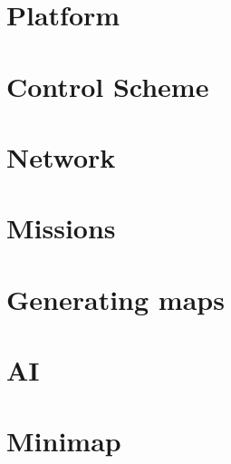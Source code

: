 \chapter{Platform}


\chapter{Control Scheme}



\chapter{Network}


\chapter{Missions}\label{chapter:modules:missions}


\chapter{Generating maps}


\chapter{AI}


\chapter{Minimap}

